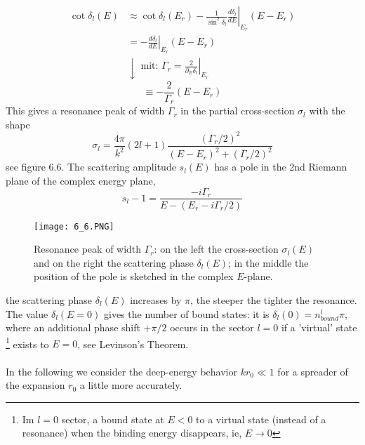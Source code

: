 \begin{equation}
\begin{aligned} \cot \delta_{l}(E) & \approx \cot \delta_{l}\left(E_{r}\right)-\left.\frac{1}{\sin ^{2} \delta_{l}} \frac{d \delta_{l}}{d E}\right|_{E_{r}}\left(E-E_{r}\right) \\ &=-\left.\frac{d \delta_{l}}{d E}\right|_{E_{r}}\left(E-E_{r}\right) \\ & \downarrow \text { mit: } \Gamma_{r}=\left.\frac{2}{\partial_{E} \delta_{l}}\right|_{E_{r}} \end{aligned}
\end{equation}
\begin{equation}
    \equiv-\frac{2}{\Gamma_{r}}\left(E-E_{r}\right)
    \end{equation}
This gives a resonance peak of width $\Gamma_r$ in the partial cross-section $\sigma_l$ with the shape
\begin{equation}
    \sigma_{l}=\frac{4 \pi}{k^{2}}(2 l+1) \frac{\left(\Gamma_{r} / 2\right)^{2}}{\left(E-E_{r}\right)^{2}+\left(\Gamma_{r} / 2\right)^{2}}
    \end{equation}
see figure 6.6. The scattering amplitude $s_l (E)$ has a pole in the 2nd Riemann plane of the complex energy plane,
\begin{equation}
    s_{l}-1=\frac{-i \Gamma_{r}}{E-\left(E_{r}-i \Gamma_{r} / 2\right)}
    \end{equation}
\begin{figure}[ht]
    \centering
    \texttt{[image: 6\_6.PNG]}
    \caption{Resonance peak of width $\Gamma_r$: on the left the cross-section $\sigma_l(E)$ and on the right the scattering phase $\delta_l(E)$; in the middle the position of the pole is sketched in the complex $E$-plane.}
\end{figure}
the scattering phase $\delta_l (E)$ increases by $\pi$, the steeper the tighter the resonance. The value $\delta_l (E = 0)$ gives the number of bound states: it is $\delta_l (0) = n^l_{bound}\pi$, where an additional phase shift $+ \pi / 2$ occurs in the sector $l = 0$ if a 'virtual' state \footnote{Im $l = 0$ sector, a bound state at $E <0$ to a virtual state (instead of a resonance) when the binding energy disappears, ie, $E \rightarrow 0$} exists to $E = 0$, see Levinson's Theorem. 
\\\\
In the following we consider the deep-energy behavior $kr_0 \ll 1$ for a spreader of the expansion $r_0$ a little more accurately.

